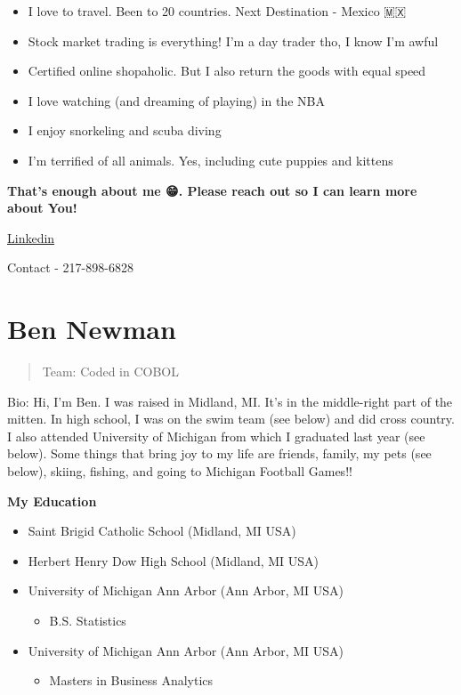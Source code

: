 \documentclass[
]{book}
\providecommand{\tightlist}{%
  \setlength{\itemsep}{0pt}\setlength{\parskip}{0pt}}
\theoremstyle{definition}
\theoremstyle{definition}
\theoremstyle{definition}
\theoremstyle{definition}
\theoremstyle{remark}
\begin{document}
\begin{itemize}
\tightlist
\item
  I love to travel. Been to 20 countries. Next Destination - Mexico 🇲🇽
\item
  Stock market trading is everything! I'm a day trader tho, I know I'm awful 🤭
\item
  Certified online shopaholic. But I also return the goods with equal speed
\item
  I love watching (and dreaming of playing) in the NBA
\item
  I enjoy snorkeling and scuba diving
\item
  I'm terrified of all animals. Yes, including cute puppies and kittens 🤯
\end{itemize}

\textbf{That's enough about me 😁. Please reach out so I can learn more about You!}

\href{https://www.linkedin.com/in/nikita-mamidi-763b80185/}{Linkedin}

Contact - 217-898-6828

\hypertarget{ben-newman}{%
\section{Ben Newman}\label{ben-newman}}

\begin{quote}
Team: Coded in COBOL
\end{quote}

Bio: Hi, I'm Ben. I was raised in Midland, MI. It's in the middle-right part of the mitten. In high school, I was on the swim team (see below) and did cross country. I also attended University of Michigan from which I graduated last year (see below). Some things that bring joy to my life are friends, family, my pets (see below), skiing, fishing, and going to Michigan Football Games!!

\textbf{My Education}

\begin{itemize}
\tightlist
\item
  Saint Brigid Catholic School (Midland, MI USA)
\item
  Herbert Henry Dow High School (Midland, MI USA)
\item
  University of Michigan Ann Arbor (Ann Arbor, MI USA)

  \begin{itemize}
  \tightlist
  \item
    B.S. Statistics
  \end{itemize}
\item
  University of Michigan Ann Arbor (Ann Arbor, MI USA)

  \begin{itemize}
  \tightlist
  \item
    Masters in Business Analytics
  \end{itemize}
\end{itemize}
\end{document}

